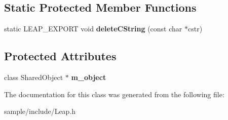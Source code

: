 \subsection*{Static Protected Member Functions}
\begin{DoxyCompactItemize}
\item 
\mbox{\label{class_leap_1_1_interface_a6c5599150476cf3f88802b149b5f6e13}} 
static L\+E\+A\+P\+\_\+\+E\+X\+P\+O\+RT void {\bfseries delete\+C\+String} (const char $\ast$cstr)
\end{DoxyCompactItemize}
\subsection*{Protected Attributes}
\begin{DoxyCompactItemize}
\item 
\mbox{\label{class_leap_1_1_interface_aebf4e096301998b829239acd895b387c}} 
class Shared\+Object $\ast$ {\bfseries m\+\_\+object}
\end{DoxyCompactItemize}


The documentation for this class was generated from the following file\+:\begin{DoxyCompactItemize}
\item 
sample/include/Leap.\+h\end{DoxyCompactItemize}
